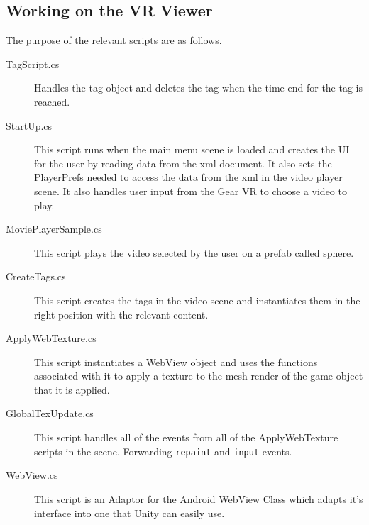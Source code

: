 \documentclass[12pt]{report}
\newcommand{\inlinecode}{\texttt}
\begin{document}
\begin{appendices}
    \section{Working on the VR Viewer}
    The purpose of the relevant scripts are as follows.
    \begin{description}
        \item[TagScript.cs] Handles the tag object and deletes the tag when
            the time end for the tag is reached.
        \item[StartUp.cs] This script runs when the main menu scene is loaded
            and creates the UI for the user by reading data from the xml
            document. It also sets the PlayerPrefs needed to access the data
            from the xml in the video player scene. It also handles user input
            from the Gear VR to choose a video to play.
        \item[MoviePlayerSample.cs] This script plays the video selected by
            the user on a prefab called sphere.
        \item[CreateTags.cs] This script creates the tags in the video scene
            and instantiates them in the right position with the relevant
            content.
        \item[ApplyWebTexture.cs] This script instantiates a WebView object and
            uses the functions associated with it to apply a texture to the
            mesh render of the game object that it is applied.
        \item[GlobalTexUpdate.cs] This script handles all of the events from
            all of the ApplyWebTexture scripts in the scene. Forwarding
            \inlinecode{repaint} and \inlinecode{input} events.
        \item[WebView.cs] This script is an Adaptor for the Android WebView
            Class which adapts it's interface into one that Unity can easily
            use.
    \end{description}
\end{appendices}
\end{document}
